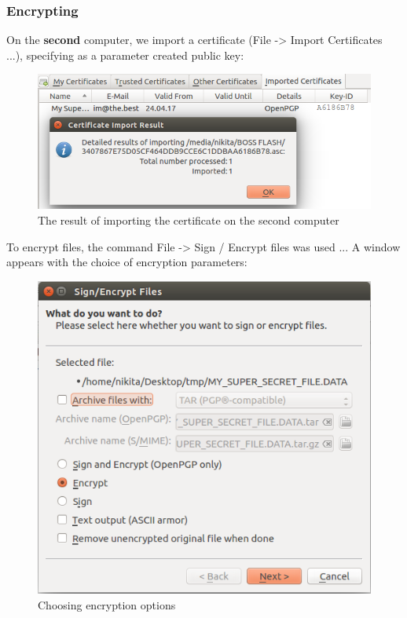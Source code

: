 \documentclass[14pt,a4paper,report]{report}
\begin{document}
\subsubsection{Encrypting}

On the \textbf{second} computer, we import a certificate (File -> Import Certificates ...), specifying as a parameter created public key:

\begin{figure}[h!]
	\centering
	\includegraphics[scale = 0.55]{images/2_1.png}
	\caption{The result of importing the certificate on the second computer}
\end{figure}

To encrypt files, the command File -> Sign / Encrypt files was used ... A window appears with the choice of encryption parameters:

\begin{figure}[h!]
	\centering
	\includegraphics[scale = 0.53]{images/2_2.png}
	\caption{Choosing encryption options}
\end{figure}
\end{document}

